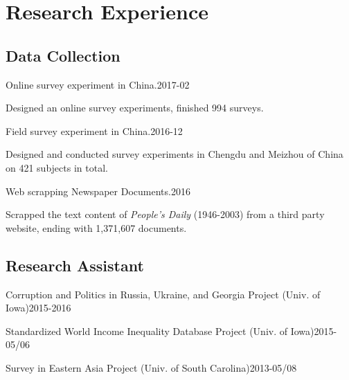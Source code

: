 \documentclass[10.5pt,]{article}
\providecommand{\tightlist}{%
	\setlength{\itemsep}{0pt}\setlength{\parskip}{0pt}}
\renewenvironment{itemize}{
	\begin{list}{}{
			\setlength{\leftmargin}{1.5em}
		}
	}{
	\end{list}
}
\begin{document}
\section{Research Experience}\label{research-experience}

\subsection{Data Collection}\label{data-collection}

\begin{itemize}
\tightlist
\item
  Online survey experiment in China.\hfill 2017-02

  \begin{itemize}
  \tightlist
  \item
    \footnotesize Designed an online survey experiments, finished 994
    surveys.
  \end{itemize}
\item
  Field survey experiment in China.\hfill 2016-12

  \begin{itemize}
  \tightlist
  \item
    \footnotesize Designed and conducted survey experiments in Chengdu
    and Meizhou of China on 421 subjects in total.
  \end{itemize}
\item
  Web scrapping Newspaper Documents.\hfill 2016

  \begin{itemize}
  \tightlist
  \item
    \footnotesize Scrapped the text content of \emph{People's Daily}
    (1946-2003) from a third party website, ending with 1,371,607
    documents.
  \end{itemize}
\end{itemize}

\subsection{Research Assistant}\label{research-assistant}

\begin{itemize}
\tightlist
\item
  Corruption and Politics in Russia, Ukraine, and Georgia Project (Univ.
  of Iowa)\hfill 2015-2016
\item
  Standardized World Income Inequality Database Project (Univ. of
  Iowa)\hfill 2015-05/06
\item
  Survey in Eastern Asia Project (Univ. of South
  Carolina)\hfill 2013-05/08
\end{itemize}
\end{document}
